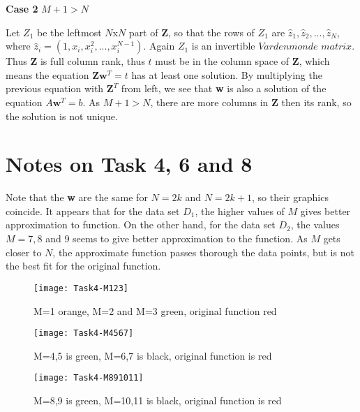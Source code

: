 \documentclass[a4paper,10pt]{article}
\begin{document}
\textbf{Case 2} $M+1 > N$

Let $Z_1$ be the leftmost $N$x$N$ part of \textbf{Z}, so that the rows of $Z_1$ are $ \hat{z}_1,\hat{z}_2,...,\hat{z}_{N}$, where $\hat{z}_i=(1,x_i,x_i^2,...,x_i^{N-1})$. Again $Z_1$ is an invertible $\textit{Vardenmonde matrix}$. Thus $\textbf{Z}$ is full column rank, thus $t$ must be in the column space of $\textbf{Z}$, which means the equation $\textbf{Z}\textbf{w}^T=t$ has at least one solution. By multiplying the previous equation with $\textbf{Z}^T$ from left, we see that \textbf{w} is also a solution of the equation $A\textbf{w}^T=b$. As $M+1>N$, there are more columns in \textbf{Z} then its rank, so the solution is not unique.  



\section*{Notes on Task 4, 6 and 8}

Note that the \textbf{w} are the same for $N=2k$ and $N=2k+1$, so their graphics coincide. 
It appears that for the data set $D_1$, the higher values of $M$ gives better approximation to function.
On the other hand, for the data set $D_2$, the values $M=7,8$ and 9 seems to give better approximation to the function. As $M$ gets closer to $N$, the approximate function passes thorough the data points, but is not the best fit for the original function. 






\begin{figure}
	\centering
	\texttt{[image: Task4-M123]}
	\caption{M=1 orange, M=2 and M=3 green, original function red}
	\label{fig:task4-m123}
\end{figure}


\begin{figure}
	\centering
	\texttt{[image: Task4-M4567]}
	\caption{M=4,5 is green, M=6,7 is black, original function is red }
	\label{fig:task4-m4567}
\end{figure}

\begin{figure}
	\centering
	\texttt{[image: Task4-M891011]}
	\caption{M=8,9 is green, M=10,11 is black, original function is red }
	\label{fig:task4-m891011}
\end{figure}
\end{document}
